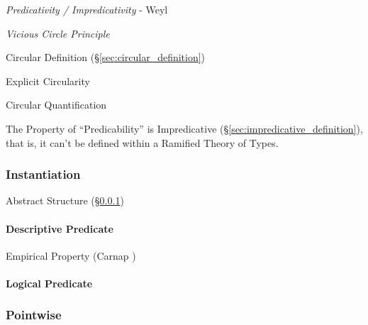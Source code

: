 \emph{Predicativity / Impredicativity} - Weyl

\emph{Vicious Circle Principle}

Circular Definition (\S\ref{sec:circular_definition})

Explicit Circularity

Circular Quantification

The Property of ``Predicability'' is Impredicative
(\S\ref{sec:impredicative_definition}), that is, it can't be defined
within a Ramified Theory of Types.\cite{kleene52}



\subsubsection{Instantiation}\label{sec:instantiation}

Abstract Structure (\S\ref{sec:instantiation})



\paragraph{Descriptive Predicate}\label{sec:descriptive_predicate}\hfill

Empirical Property (Carnap \cite{carnap59})



\paragraph{Logical Predicate}\label{sec:logical_predicate}\hfill



\subsubsection{Pointwise}\label{sec:pointwise}
